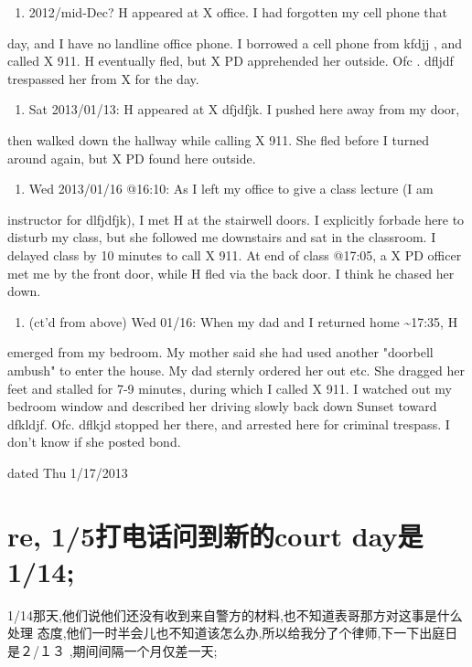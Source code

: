 \documentclass[12pt]{book}
\begin{document}
\begin{enumerate}
\item 2012/mid-Dec? H appeared at X office. I had forgotten my cell phone that
\end{enumerate}
day, and I have no landline office phone. I borrowed a cell phone from kfdjj
, and called X 911. H eventually fled, but X PD apprehended her outside. Ofc
. dfljdf trespassed her from X for the day. 

\begin{enumerate}
\item Sat 2013/01/13: H appeared at X dfjdfjk. I pushed here away from my door,
\end{enumerate}
then walked down the hallway while calling X 911. She fled before I turned 
around again, but X PD found here outside. 

\begin{enumerate}
\item Wed 2013/01/16 @16:10: As I left my office to give a class lecture (I am
\end{enumerate}
instructor for dlfjdfjk), I met H at the stairwell doors. I explicitly 
forbade here to disturb my class, but she followed me downstairs and sat in 
the classroom. I delayed class by 10 minutes to call X 911. At end of class 
@17:05, a X PD officer met me by the front door, while H fled via the back 
door. I think he chased her down. 

\begin{enumerate}
\item (ct'd from above) Wed 01/16: When my dad and I returned home \textasciitilde{}17:35, H
\end{enumerate}
emerged from my bedroom. My mother said she had used another "doorbell 
ambush" to enter the house. My dad sternly ordered her out etc. She dragged 
her feet and stalled for 7-9 minutes, during which I called X 911. I watched
out my bedroom window and described her driving slowly back down Sunset 
toward dfkldjf. Ofc. dflkjd stopped her there, and arrested here for 
criminal trespass. I don't know if she posted bond. 

dated Thu 1/17/2013

\chapter{re, 1/5打电话问到新的court day是1/14;}
\label{sec-51}

1/14那天,他们说他们还没有收到来自警方的材料,也不知道表哥那方对这事是什么处理
态度,他们一时半会儿也不知道该怎么办,所以给我分了个律师,下一下出庭日是２/１３
,期间间隔一个月仅差一天;
\end{document}
